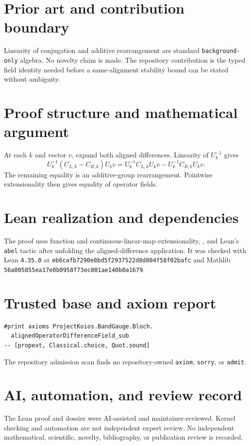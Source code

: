 \documentclass[11pt]{article}
\begin{document}
\section{Prior art and contribution boundary}
Linearity of conjugation and additive rearrangement are standard \texttt{background-only} algebra.  No novelty claim is made.  The repository contribution is the typed field identity needed before a same-alignment stability bound can be stated without ambiguity.

\section{Proof structure and mathematical argument}
At each $k$ and vector $v$, expand both aligned differences.  Linearity of $U_k^{-1}$ gives
\[
 U_k^{-1}(C_{L,k}-C_{R,k})U_kv
 =U_k^{-1}C_{L,k}U_kv-U_k^{-1}C_{R,k}U_kv.
\]
The remaining equality is an additive-group rearrangement.  Pointwise extensionality then gives equality of operator fields.

\section{Lean realization and dependencies}
The proof uses function and continuous-linear-map extensionality, , and Lean's \texttt{abel} tactic after unfolding the aligned-difference application.  It was checked with Lean \texttt{4.35.0} at \texttt{eb6cafb7290e8bd5f2937522d8d804f58f02bafc} and Mathlib \texttt{56a005855ea17e0b0958f73ec801ae140b0a1679}.

\section{Trusted base and axiom report}
\begin{verbatim}
#print axioms ProjectKoios.BandGauge.Bloch.
  alignedOperatorDifferenceField_sub
-- [propext, Classical.choice, Quot.sound]
\end{verbatim}
The repository admission scan finds no repository-owned \texttt{axiom}, \texttt{sorry}, or \texttt{admit}.

\section{AI, automation, and review record}
The Lean proof and dossier were AI-assisted and maintainer-reviewed.  Kernel checking and automation are not independent expert review.  No independent mathematical, scientific, novelty, bibliography, or publication review is recorded.
\end{document}

